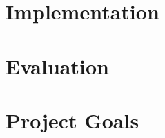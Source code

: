 \section{Implementation}



\section{Evaluation}
\section{Project Goals}
\begin{itemize}

\end{itemize}
